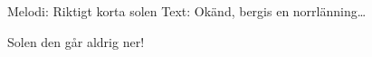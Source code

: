 \begin{song}

\begin{songmeta}
Melodi: Riktigt korta solen
Text: Okänd, bergis en norrlänning\ldots
\end{songmeta}

\begin{songtext}
Solen den går aldrig ner!

\end{songtext}
\end{song}
